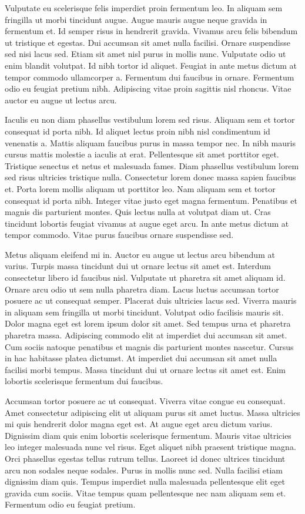 \documentclass[11pt,a4paper]{article}
\begin{document}
Vulputate eu scelerisque felis imperdiet proin fermentum leo. In aliquam sem fringilla ut morbi tincidunt augue. Augue mauris augue neque gravida in fermentum et. Id semper risus in hendrerit gravida. Vivamus arcu felis bibendum ut tristique et egestas. Dui accumsan sit amet nulla facilisi. Ornare suspendisse sed nisi lacus sed. Etiam sit amet nisl purus in mollis nunc. Vulputate odio ut enim blandit volutpat. Id nibh tortor id aliquet. Feugiat in ante metus dictum at tempor commodo ullamcorper a. Fermentum dui faucibus in ornare. Fermentum odio eu feugiat pretium nibh. Adipiscing vitae proin sagittis nisl rhoncus. Vitae auctor eu augue ut lectus arcu.

Iaculis eu non diam phasellus vestibulum lorem sed risus. Aliquam sem et tortor consequat id porta nibh. Id aliquet lectus proin nibh nisl condimentum id venenatis a. Mattis aliquam faucibus purus in massa tempor nec. In nibh mauris cursus mattis molestie a iaculis at erat. Pellentesque sit amet porttitor eget. Tristique senectus et netus et malesuada fames. Diam phasellus vestibulum lorem sed risus ultricies tristique nulla. Consectetur lorem donec massa sapien faucibus et. Porta lorem mollis aliquam ut porttitor leo. Nam aliquam sem et tortor consequat id porta nibh. Integer vitae justo eget magna fermentum. Penatibus et magnis dis parturient montes. Quis lectus nulla at volutpat diam ut. Cras tincidunt lobortis feugiat vivamus at augue eget arcu. In ante metus dictum at tempor commodo. Vitae purus faucibus ornare suspendisse sed.

Metus aliquam eleifend mi in. Auctor eu augue ut lectus arcu bibendum at varius. Turpis massa tincidunt dui ut ornare lectus sit amet est. Interdum consectetur libero id faucibus nisl. Vulputate ut pharetra sit amet aliquam id. Ornare arcu odio ut sem nulla pharetra diam. Lacus luctus accumsan tortor posuere ac ut consequat semper. Placerat duis ultricies lacus sed. Viverra mauris in aliquam sem fringilla ut morbi tincidunt. Volutpat odio facilisis mauris sit. Dolor magna eget est lorem ipsum dolor sit amet. Sed tempus urna et pharetra pharetra massa. Adipiscing commodo elit at imperdiet dui accumsan sit amet. Cum sociis natoque penatibus et magnis dis parturient montes nascetur. Cursus in hac habitasse platea dictumst. At imperdiet dui accumsan sit amet nulla facilisi morbi tempus. Massa tincidunt dui ut ornare lectus sit amet est. Enim lobortis scelerisque fermentum dui faucibus.

Accumsan tortor posuere ac ut consequat. Viverra vitae congue eu consequat. Amet consectetur adipiscing elit ut aliquam purus sit amet luctus. Massa ultricies mi quis hendrerit dolor magna eget est. At augue eget arcu dictum varius. Dignissim diam quis enim lobortis scelerisque fermentum. Mauris vitae ultricies leo integer malesuada nunc vel risus. Eget aliquet nibh praesent tristique magna. Orci phasellus egestas tellus rutrum tellus. Laoreet id donec ultrices tincidunt arcu non sodales neque sodales. Purus in mollis nunc sed. Nulla facilisi etiam dignissim diam quis. Tempus imperdiet nulla malesuada pellentesque elit eget gravida cum sociis. Vitae tempus quam pellentesque nec nam aliquam sem et. Fermentum odio eu feugiat pretium.
\end{document}
